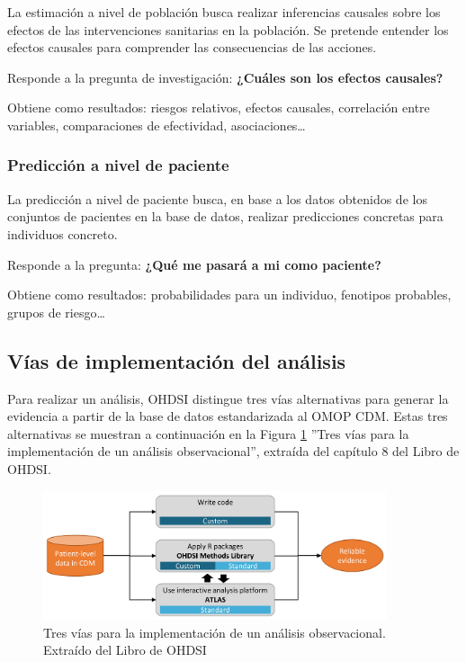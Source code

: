 La estimación a nivel de población busca realizar inferencias causales sobre los efectos de las intervenciones sanitarias en la población. Se pretende entender los efectos causales para comprender las consecuencias de las acciones.

Responde a la pregunta de investigación: \textbf{¿Cuáles son los efectos causales?}

Obtiene como resultados: riesgos relativos, efectos causales, correlación entre variables, comparaciones de efectividad, asociaciones…

\subsubsection{Predicción a nivel de paciente}

La predicción a nivel de paciente busca, en base a los datos obtenidos de los conjuntos de pacientes en la base de datos, realizar predicciones concretas para individuos concreto.

Responde a la pregunta: \textbf{¿Qué me pasará a mi como paciente?}

Obtiene como resultados: probabilidades para un individuo, fenotipos probables, grupos de riesgo… 


\subsection{Vías de implementación del análisis} \label{subsec:05vias}

Para realizar un análisis, OHDSI distingue tres vías alternativas para generar la evidencia a partir de la base de datos estandarizada al OMOP CDM. Estas tres alternativas se muestran a continuación en la Figura \ref{fig:analysisImplementations} ''Tres vías para la implementación de un análisis observacional'', extraída del capítulo 8 del Libro de OHDSI.

\begin{figure}[H]
    \centering
    \includegraphics[width=0.90\textwidth]{figures/analysisImplementations.png}
     \caption{Tres vías para la implementación de un análisis observacional. Extraído del Libro de OHDSI \parencite{OHDSIbook}}
    \label{fig:analysisImplementations}
\end{figure}

